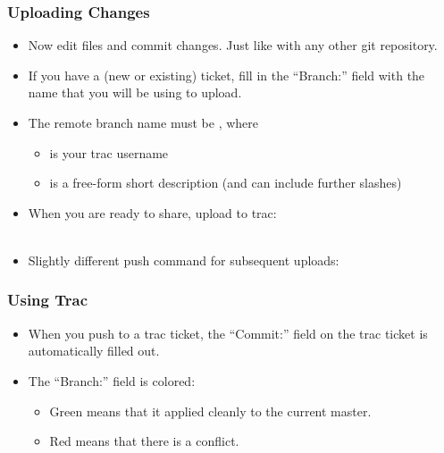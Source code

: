 \begin{frame}
  \frametitle{Uploading Changes}

  \begin{itemize}
  \item Now edit files and commit changes. Just like with any other git
    repository.
  \item If you have a (new or existing) ticket, fill in the
    ``Branch:'' field with the name that you will be using to upload.
  \item The remote branch name must be , where
    \begin{itemize}
    \item {} is your trac username
    \item {} is a free-form short description (and can
      include further slashes)
    \end{itemize}
  \item 
    When you are ready to share, upload to trac:\\
    \\
    \hspace{2cm}
  \item 
    Slightly different push command for subsequent uploads:\\
  \end{itemize}
\end{frame}


\begin{frame}
  \frametitle{Using Trac}

  \begin{itemize}
  \item When you push to a trac ticket, the ``Commit:'' field on the
    trac ticket is automatically filled out.
  \item The ``Branch:'' field is colored:
    \begin{itemize}
    \item Green means that it applied cleanly to the current master.
    \item Red means that there is a conflict.
    \end{itemize}
  \end{itemize}
\end{frame}


